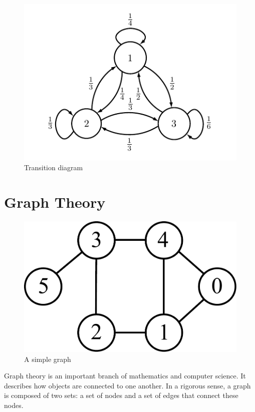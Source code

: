 \begin{figure}[h!]
\begin{center}
\includegraphics[scale = 1.4]{markov2}
\end{center}
\caption{Transition diagram}
\label{markov2}
\end{figure}

\newpage

\section*{Graph Theory}
\begin{figure}[h!]
\includegraphics[scale = .4]{graphExample}
\caption{A simple graph}
\label{markov:example_graph}
\end{figure}

Graph theory is an important branch of mathematics and computer science.
It describes how objects are connected to one another.
In a rigorous sense, a graph is composed of two sets: a set of nodes and a set of edges that connect these nodes. 

